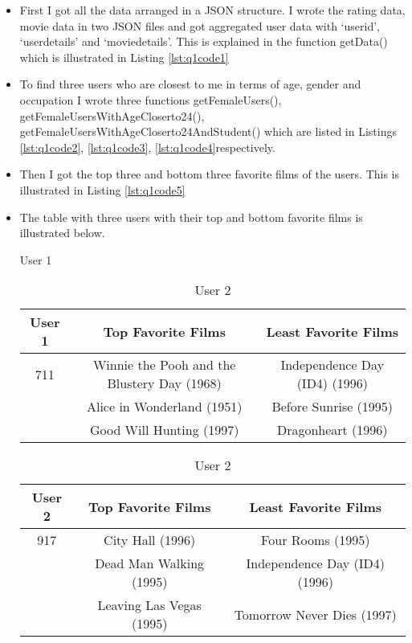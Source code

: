 \begin{itemize}
\item  First I got all the data arranged in a JSON structure. I wrote the rating data, movie data in two JSON files and got aggregated user data with `user\textunderscore id', `user\textunderscore details' and `movie\textunderscore details'. This is explained in the function getData() which is illustrated in Listing \ref{lst:q1code1}
\item To find three users who are closest to me in terms of age, gender and occupation I wrote three functions getFemaleUsers(), getFemaleUsersWithAgeCloserto24(), getFemaleUsersWithAgeCloserto24AndStudent() which are listed in Listings \ref{lst:q1code2}, \ref{lst:q1code3}, \ref{lst:q1code4}respectively.
\item Then I got the top three and bottom three favorite films of the users. This is illustrated in Listing \ref{lst:q1code5} 
\item The table with three users with their top and bottom favorite films is illustrated below.
\begin{table}

\caption{User 1}
\label{}
\begin{center}
\begin{tabular}{| c | c | c |}
\hline
User 1  & Top Favorite Films & Least Favorite Films\\ \hline  
711  & Winnie the Pooh and the Blustery Day (1968) & Independence Day (ID4) (1996) \\ \hline   
   & Alice in Wonderland (1951) & Before Sunrise (1995) \\ \hline  
  & Good Will Hunting (1997)  & Dragonheart (1996) \\ \hline  

\hline
\end{tabular}
\end{center}

\caption{User 2}
\label{}
\begin{center}
\begin{tabular}{| c | c | c |}
\hline
User 2  & Top Favorite Films & Least Favorite Films\\ \hline  
917 & City Hall (1996) & Four Rooms (1995) \\ \hline   
   & Dead Man Walking (1995) & Independence Day (ID4) (1996) \\ \hline  
  & Leaving Las Vegas (1995)  & Tomorrow Never Dies (1997) \\ \hline   
 

\end{tabular}
\end{center}
\end{table}
\end{itemize}
